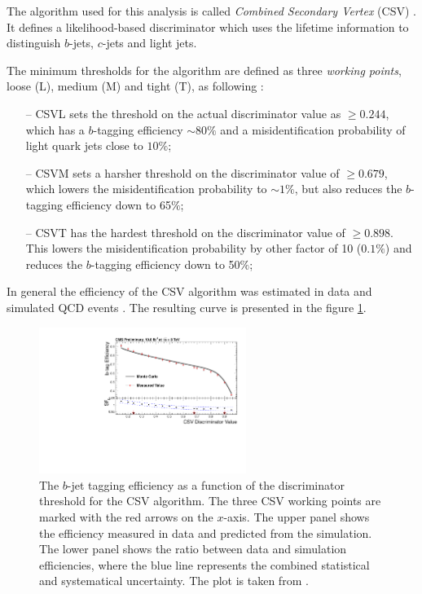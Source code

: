 The algorithm used for this analysis is called \textit{Combined Secondary Vertex} (CSV) \cite{CMS-PAS-BTV-13-001}. It defines a likelihood-based discriminator which uses 
the lifetime information to distinguish $b$-jets, $c$-jets and light jets.

The minimum thresholds for the algorithm are defined as three \textit{working points}, loose (L), medium (M) and tight (T), as following \cite{CMS-PAS-BTV-13-001}:

\begin{itemize}
 \item [--] CSVL sets the threshold on the actual discriminator value as $\geq 0.244$, which has a $b$-tagging efficiency $\sim 80\%$ and a misidentification probability of
 light quark jets close to $10\%$;
 \item [--] CSVM sets a harsher threshold on the discriminator value of $\geq 0.679$, which lowers the misidentification probability to $\sim 1\%$, but also
 reduces the $b$-tagging efficiency down to 65$\%$;
 \item [--] CSVT has the hardest threshold on the discriminator value of $\geq 0.898$. This lowers the misidentification probability by other factor of 10 ($0.1\%$)
 and reduces the $b$-tagging efficiency down to 50$\%$;
\end{itemize}

In general the efficiency of the CSV algorithm was estimated in data and simulated QCD events \cite{CMS-PAS-BTV-13-001}. The resulting curve is presented in the figure \ref{fig:CSVeff}.

\begin{figure}[t]
  \centering
  \includegraphics[width=0.6\textwidth]{04_event_reconstruction/plots/Figure_012-b.pdf}
  \caption{The $b$-jet tagging efficiency as a function of the discriminator threshold for the CSV algorithm. The three CSV working points are marked with the red arrows on the $x$-axis.
  The upper panel shows the efficiency measured in data and predicted from the simulation.
  The lower panel shows the ratio between data and simulation efficiencies, where the blue line represents the combined statistical and systematical uncertainty. The plot is taken from \cite{CMS-PAS-BTV-13-001}.}
  \label{fig:CSVeff}
\end{figure}

